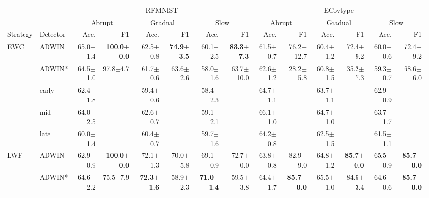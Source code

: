 \begin{tabular}{llrrrrrrrrrrrr}
\toprule
 &  & \multicolumn{6}{c}{RFMNIST} & \multicolumn{6}{c}{ECovtype} \\
\cmidrule(lr){3-8}\cmidrule(lr){9-14}
 &  & \multicolumn{2}{c}{Abrupt} & \multicolumn{2}{c}{Gradual} & \multicolumn{2}{c}{Slow} & \multicolumn{2}{c}{Abrupt} & \multicolumn{2}{c}{Gradual} & \multicolumn{2}{c}{Slow} \\
\cmidrule(lr){3-4}\cmidrule(lr){5-6}\cmidrule(lr){7-8}\cmidrule(lr){9-10}\cmidrule(lr){11-12}\cmidrule(lr){13-14}
Strategy & Detector & Acc. & F1 & Acc. & F1 & Acc. & F1 & Acc. & F1 & Acc. & F1 & Acc. & F1 \\
\midrule
\multirow[t]{5}{*}{EWC} & ADWIN & 65.0\tiny{$\pm$1.4} & \textbf{100.0\tiny{$\pm$0.0}} & 62.5\tiny{$\pm$0.8} & \textbf{74.9\tiny{$\pm$3.5}} & 60.1\tiny{$\pm$2.5} & \textbf{83.3\tiny{$\pm$7.3}} & 61.5\tiny{$\pm$0.7} & 76.2\tiny{$\pm$12.7} & 60.4\tiny{$\pm$1.2} & 72.4\tiny{$\pm$9.2} & 60.0\tiny{$\pm$0.6} & 72.4\tiny{$\pm$9.2} \\
 & ADWIN* & 64.5\tiny{$\pm$1.0} & 97.8\tiny{$\pm$4.7} & 61.7\tiny{$\pm$0.6} & 63.6\tiny{$\pm$2.6} & 58.0\tiny{$\pm$1.6} & 63.7\tiny{$\pm$10.0} & 62.6\tiny{$\pm$1.2} & 28.2\tiny{$\pm$5.8} & 60.8\tiny{$\pm$1.5} & 35.2\tiny{$\pm$7.3} & 59.3\tiny{$\pm$0.7} & 68.6\tiny{$\pm$6.0} \\
 & early & 62.4\tiny{$\pm$1.8} &  & 59.4\tiny{$\pm$0.6} &  & 58.4\tiny{$\pm$2.3} &  & 64.7\tiny{$\pm$1.1} &  & 63.7\tiny{$\pm$1.1} &  & 62.9\tiny{$\pm$0.9} &  \\
 & mid & 64.0\tiny{$\pm$2.5} &  & 62.6\tiny{$\pm$0.7} &  & 59.1\tiny{$\pm$2.1} &  & 66.1\tiny{$\pm$1.0} &  & 64.7\tiny{$\pm$1.0} &  & 63.7\tiny{$\pm$1.7} &  \\
 & late & 60.0\tiny{$\pm$1.4} &  & 60.4\tiny{$\pm$0.7} &  & 59.7\tiny{$\pm$1.6} &  & 64.2\tiny{$\pm$0.8} &  & 62.5\tiny{$\pm$1.5} &  & 61.5\tiny{$\pm$1.1} &  \\
\midrule
\multirow[t]{5}{*}{LWF} & ADWIN & 62.9\tiny{$\pm$0.9} & \textbf{100.0\tiny{$\pm$0.0}} & 72.1\tiny{$\pm$1.3} & 70.0\tiny{$\pm$5.8} & 69.1\tiny{$\pm$0.9} & 72.7\tiny{$\pm$0.0} & 63.8\tiny{$\pm$0.8} & 82.9\tiny{$\pm$9.0} & 64.8\tiny{$\pm$1.2} & \textbf{85.7\tiny{$\pm$0.0}} & 65.5\tiny{$\pm$0.9} & \textbf{85.7\tiny{$\pm$0.0}} \\
 & ADWIN* & 64.6\tiny{$\pm$2.2} & 75.5\tiny{$\pm$7.9} & \textbf{72.3\tiny{$\pm$1.6}} & 58.9\tiny{$\pm$2.3} & \textbf{71.0\tiny{$\pm$1.4}} & 59.5\tiny{$\pm$3.8} & 64.4\tiny{$\pm$1.7} & \textbf{85.7\tiny{$\pm$0.0}} & 65.5\tiny{$\pm$1.0} & 84.6\tiny{$\pm$3.4} & 64.6\tiny{$\pm$0.6} & \textbf{85.7\tiny{$\pm$0.0}} \\

\end{tabular}
